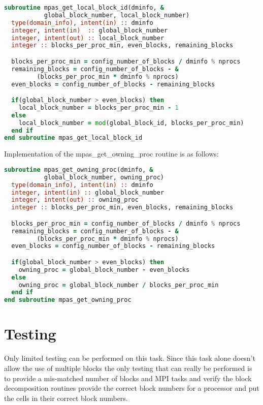 \documentclass[11pt]{report}
\begin{document}
\begin{lstlisting}[language=fortran,escapechar=@,frame=single]
subroutine mpas_get_local_block_id(dminfo, &
           global_block_number, local_block_number)
  type(domain_info), intent(in) :: dminfo
  integer, intent(in)  :: global_block_number
  integer, intent(out) :: local_block_number
  integer :: blocks_per_proc_min, even_blocks, remaining_blocks

  blocks_per_proc_min = config_number_of_blocks / dminfo % nprocs
  remaining_blocks = config_number_of_blocks - &
         (blocks_per_proc_min * dminfo % nprocs)
  even_blocks = config_number_of_blocks - remaining_blocks

  if(global_block_number > even_blocks) then
	local_block_number = blocks_per_proc_min - 1
  else
    local_block_number = mod(global_block_id, blocks_per_proc_min)
  end if
end subroutine mpas_get_local_block_id
\end{lstlisting}

\pagebreak

Implementation of the mpas\_get\_owning\_proc routine is as follows:

\begin{lstlisting}[language=fortran,escapechar=@,frame=single]
subroutine mpas_get_owning_proc(dminfo, &
           global_block_number, owning_proc)
  type(domain_info), intent(in) :: dminfo
  integer, intent(in) :: global_block_number
  integer, intent(out) :: owning_proc
  integer :: blocks_per_proc_min, even_blocks, remaining_blocks

  blocks_per_proc_min = config_number_of_blocks / dminfo % nprocs
  remaining_blocks = config_number_of_blocks - &
         (blocks_per_proc_min * dminfo % nprocs)
  even_blocks = config_number_of_blocks - remaining_blocks

  if(global_block_number > even_blocks) then
    owning_proc = global_block_number - even_blocks
  else
    owning_proc = global_block_number / blocks_per_proc_min
  end if
end subroutine mpas_get_owning_proc
\end{lstlisting}

\chapter{Testing}
Only limited testing can be performed on this task. Since this task alone
doesn't allow the use of multiple blocks the only testing that can really be
performed is to provide a mis-matched number of blocks and MPI tasks and verify
the block decomposition routines provide the correct block numbers for a
processor and put the cells in their correct block numbers.
\end{document}
